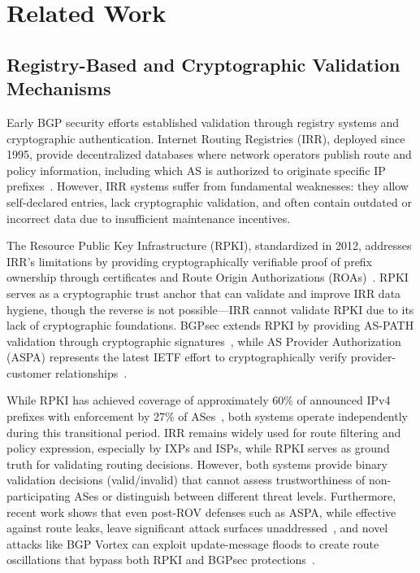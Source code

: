 \section{Related Work}
\label{sec:relatedWork}

\subsection{Registry-Based and Cryptographic Validation Mechanisms}

Early BGP security efforts established validation through registry systems and cryptographic authentication. Internet Routing Registries (IRR), deployed since 1995, provide decentralized databases where network operators publish route and policy information, including which AS is authorized to originate specific IP prefixes~\cite{DuIRATSc23}. However, IRR systems suffer from fundamental weaknesses: they allow self-declared entries, lack cryptographic validation, and often contain outdated or incorrect data due to insufficient maintenance incentives.

The Resource Public Key Infrastructure (RPKI), standardized in 2012, addresses IRR's limitations by providing cryptographically verifiable proof of prefix ownership through certificates and Route Origin Authorizations (ROAs)~\cite{RPKI}. RPKI serves as a cryptographic trust anchor that can validate and improve IRR data hygiene, though the reverse is not possible—IRR cannot validate RPKI due to its lack of cryptographic foundations. BGPsec extends RPKI by providing AS-PATH validation through cryptographic signatures~\cite{bgpsec}, while AS Provider Authorization (ASPA) represents the latest IETF effort to cryptographically verify provider-customer relationships~\cite{furuness2025aspa}.

While RPKI has achieved coverage of approximately 60\% of announced IPv4 prefixes with enforcement by 27\% of ASes~\cite{KangLRKC24IRRedicator}, both systems operate independently during this transitional period. IRR remains widely used for route filtering and policy expression, especially by IXPs and ISPs, while RPKI serves as ground truth for validating routing decisions. However, both systems provide binary validation decisions (valid/invalid) that cannot assess trustworthiness of non-participating ASes or distinguish between different threat levels. Furthermore, recent work shows that even post-ROV defenses such as ASPA, while effective against route leaks, leave significant attack surfaces unaddressed~\cite{furuness2025aspa}, and novel attacks like BGP Vortex can exploit update-message floods to create route oscillations that bypass both RPKI and BGPsec protections~\cite{stoger2025vortex}.

